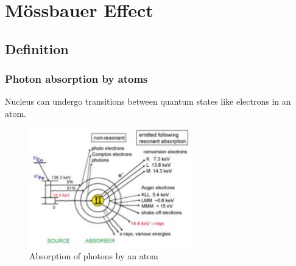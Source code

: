 \section{Mössbauer Effect}

\frame[plain]{\tableofcontents[currentsection]}

\subsection{Definition}
	\begin{frame}
		\frametitle{Photon absorption by atoms}
		Nucleus can undergo transitions between quantum states like electrons in an atom.
		
		\begin{figure}
			\includegraphics[width=7cm]{images/nuclear-excitations.jpg}
			\caption{Absorption of photons by an atom}
		\end{figure}
	\end{frame}

